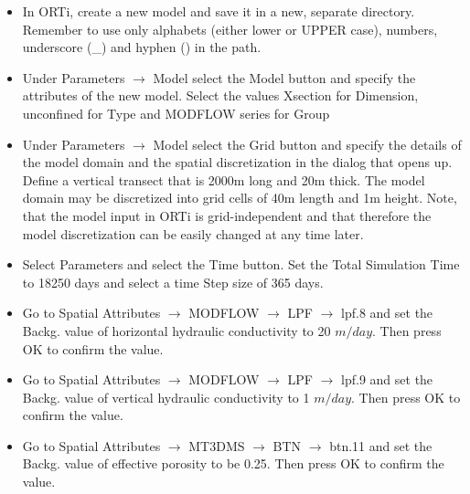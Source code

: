 \begin{itemize}

\item In ORTi, create a new model and save it in a new, separate directory.
Remember to use only alphabets (either lower or UPPER case), numbers, 
underscore (\_) and hyphen (\textemdash) in the path.

\item Under {\color{blue}Parameters} $\rightarrow$ {\color{blue}Model} select the {\color{blue}Model} button and specify the attributes of the new model. Select the values {\color{blue}Xsection} for {\color{blue}Dimension}, {\color{blue}unconfined} for {\color{blue}Type} 
and {\color{blue}MODFLOW series} for {\color{blue}Group} 

\item Under {\color{blue}Parameters} $\rightarrow$ {\color{blue}Model} select the {\color{blue}Grid} button and specify the details of the model domain and the spatial discretization in the dialog that opens up. Define a vertical transect that is 2000m long and 20m thick. The model domain
may be discretized into grid cells of 40m length and 1m height. Note, that the model input in ORTi
is grid-independent and that therefore the model discretization can be easily changed 
at any time later. 

\item Select {\color{blue}Parameters} and select the {\color{blue}Time} button.
Set the {\color{blue}Total Simulation Time} to 18250 days and select a time {\color{blue}Step size}
of 365 days. 

\item Go to {\color{blue}Spatial Attributes} $\rightarrow$ {\color{blue}MODFLOW} $\rightarrow$ {\color{blue}LPF} $\rightarrow$ {\color{blue}lpf.8} and set the {\color{blue}Backg.} value of horizontal hydraulic conductivity to 20 $m/day$. Then press {\color{blue}OK} to confirm the value.

\item Go to {\color{blue}Spatial Attributes} $\rightarrow$ {\color{blue}MODFLOW} $\rightarrow$ {\color{blue}LPF} $\rightarrow$ {\color{blue}lpf.9} and set the {\color{blue}Backg.} value of vertical hydraulic conductivity to 1 $m/day$. Then press {\color{blue}OK} to confirm the value.

\item Go to {\color{blue}Spatial Attributes} $\rightarrow$ {\color{blue}MT3DMS} $\rightarrow$ {\color{blue}BTN} $\rightarrow$ {\color{blue}btn.11} and set the {\color{blue}Backg.} value of effective porosity to be 0.25. Then press {\color{blue}OK} to confirm the value.



\end{itemize}
